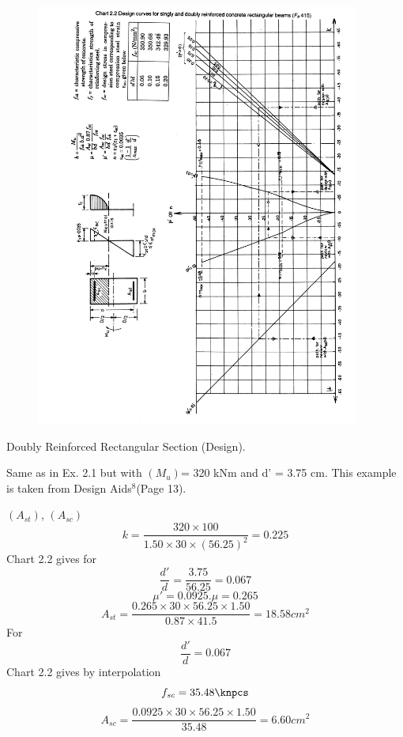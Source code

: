\begin{figure}
\centering
\includegraphics[width=0.95\textwidth]{images/ch2-6.png}
\caption{}
\label{Values for parameters}
\end{figure}
\newpage
\begin{example} Doubly Reinforced Rectangular Section (Design).

\given Same as in Ex. 2.1 but with $(M_{u})$= 320 kNm and d’ = 3.75 cm. This example is taken
from Design Aids$^{8}$(Page 13).

\required $(A_{st})$, $(A_{sc})$
\solution
$$k=\frac{320 \times 100}{1.50 \times 30 \times (56.25)^2}=0.225$$
Chart 2.2 gives for
$$\frac{d'}{d}=\frac{3.75}{56.25}=0.067$$ 
$$\mu'=0.0925.\mu=0.265$$
$$A_{st}=\frac{0.265 \times 30\times 56.25 \times 1.50}{0.87 \times 41.5}=18.58cm^2$$
For
$$\frac{d'}{d}=0.067$$
Chart 2.2 gives by interpolation
$$f_{sc}=35.48\knpcs$$
$$A_{sc}=\frac{0.0925 \times 30 \times 56.25 \times 1.50}{35.48}=6.60cm^2$$
\end{example}


